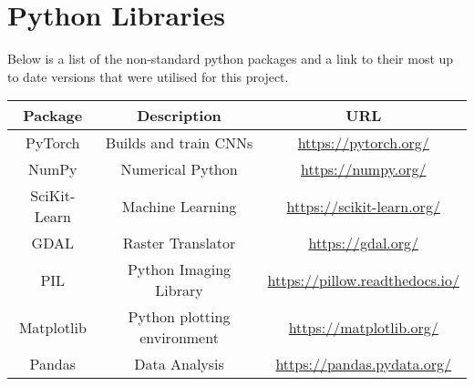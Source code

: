 \section{Python Libraries}

Below is a list of the non-standard python packages and a link to their most up to date versions that were utilised for this project.

\begin{table}[htbp]
    \begin{adjustbox}{width=\textwidth}
\begin{tabular}{c c c}\toprule
\textbf{Package} & \textbf{Description} & \textbf{URL} \\ \toprule
PyTorch & Builds and train CNNs & \url{https://pytorch.org/}  \\
NumPy & Numerical Python & \url{https://numpy.org/}  \\
SciKit-Learn  &Machine Learning & \url{https://scikit-learn.org/} \\
GDAL & Raster Translator & \url{https://gdal.org/} \\
PIL & Python Imaging Library & \url{https://pillow.readthedocs.io/} \\
Matplotlib & Python plotting environment & \url{https://matplotlib.org/}\\
Pandas & Data Analysis & \url{https://pandas.pydata.org/} \\ \bottomrule
\end{tabular}
\end{adjustbox}
\end{table}
